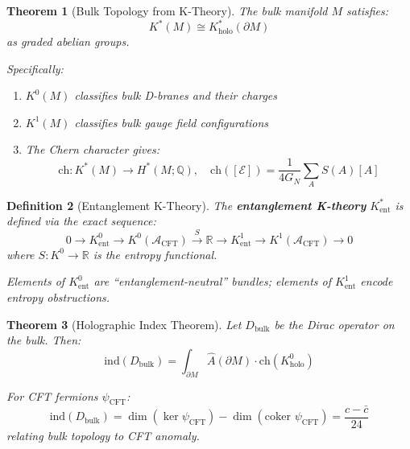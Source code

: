 \documentclass[12pt,a4paper]{article}
\newtheorem{theorem}{Theorem}[section]
\newtheorem{definition}[theorem]{Definition}
\begin{document}
\begin{theorem}[Bulk Topology from K-Theory]\label{thm:bulk-topology-k}
The bulk manifold $M$ satisfies:
\begin{equation}
K^*(M) \cong K_{\text{holo}}^*(\partial M)
\end{equation}
as graded abelian groups.

Specifically:
\begin{enumerate}
    \item $K^0(M)$ classifies bulk D-branes and their charges
    \item $K^1(M)$ classifies bulk gauge field configurations
    \item The Chern character gives:
    \begin{equation}
    \text{ch}: K^*(M) \to H^*(M; \mathbb{Q}), \quad \text{ch}([\mathcal{E}]) = \frac{1}{4G_N} \sum_A S(A) [A]
    \end{equation}
\end{enumerate}
\end{theorem}

\begin{definition}[Entanglement K-Theory]\label{def:ent-k-theory}
The \textbf{entanglement K-theory} $K_{\text{ent}}^*$ is defined via the exact sequence:
\begin{equation}
0 \to K_{\text{ent}}^0 \to K^0(\mathcal{A}_{\text{CFT}}) \xrightarrow{S} \mathbb{R} \to K_{\text{ent}}^1 \to K^1(\mathcal{A}_{\text{CFT}}) \to 0
\end{equation}
where $S: K^0 \to \mathbb{R}$ is the entropy functional.

Elements of $K_{\text{ent}}^0$ are ``entanglement-neutral'' bundles; elements of $K_{\text{ent}}^1$ encode entropy obstructions.
\end{definition}

\begin{theorem}[Holographic Index Theorem]\label{thm:holo-index}
Let $D_{\text{bulk}}$ be the Dirac operator on the bulk. Then:
\begin{equation}
\text{ind}(D_{\text{bulk}}) = \int_{\partial M} \hat{A}(\partial M) \cdot \text{ch}(K_{\text{holo}}^0)
\end{equation}

For CFT fermions $\psi_{\text{CFT}}$:
\begin{equation}
\text{ind}(D_{\text{bulk}}) = \dim(\ker \psi_{\text{CFT}}) - \dim(\text{coker } \psi_{\text{CFT}}) = \frac{c - \bar{c}}{24}
\end{equation}
relating bulk topology to CFT anomaly.
\end{theorem}
\end{document}
